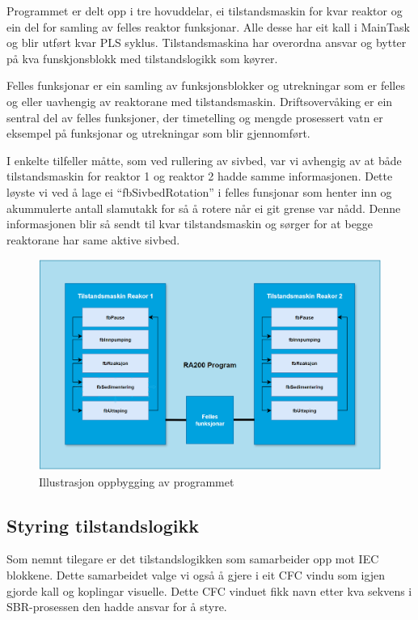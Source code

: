 Programmet er delt opp i tre hovuddelar, ei tilstandsmaskin for kvar reaktor og ein del for samling av felles reaktor funksjonar.
Alle desse har eit kall i MainTask og blir utført kvar PLS syklus. Tilstandsmaskina har overordna ansvar og bytter på kva 
funskjonsblokk med tilstandslogikk som køyrer.

Felles funksjonar er ein samling av funksjonsblokker og utrekningar som er felles og eller uavhengig av reaktorane med tilstandsmaskin.
Driftsovervåking er ein sentral del av felles funksjoner, der timetelling og mengde prosessert vatn er eksempel på funksjonar og utrekningar
som blir gjennomført.

I enkelte tilfeller måtte, som ved rullering av sivbed, var vi avhengig av at både tilstandsmaskin for reaktor 1 og reaktor 2 hadde samme informasjonen.
Dette løyste vi ved å lage ei ``fbSivbedRotation'' i felles funsjonar som henter inn og akummulerte antall slamutakk for så å rotere når ei git grense var nådd.
Denne informasjonen blir så sendt til kvar tilstandsmaskin og sørger for at begge reaktorane har same aktive sivbed.


\begin{figure}[htbp]
    \centering
    \includegraphics[width=1\textwidth]{Figurar/Oppbygging_Program.png}
    \caption{Illustrasjon oppbygging av programmet}\label{fig:OppbyggingProgram}
\end{figure}


\newpage

\subsection{Styring tilstandslogikk}

Som nemnt tilegare er det tilstandslogikken som samarbeider opp mot \gls{IEC} blokkene. Dette samarbeidet valge vi også å gjere i eit
\gls{CFC} vindu som igjen gjorde kall og koplingar visuelle. Dette \gls{CFC} vinduet fikk navn etter kva sekvens i SBR-prosessen
den hadde ansvar for å styre. 

